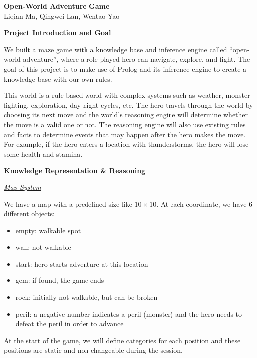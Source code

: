 \documentclass[9pt]{article}
\begin{document}
\begin{center}
\textbf{\Large Open-World Adventure Game}\\[.2cm]
Liqian Ma, Qingwei Lan, Wentao Yao
\end{center}


\begin{multicols*}{2}


\underline{\textbf{\normalsize Project Introduction and Goal}}

We built a maze game with a knowledge base and inference engine called “open-world adventure”, where a role-played hero can navigate, explore, and fight. The goal of this project is to make use of Prolog and its inference engine to create a knowledge base with our own rules.

This world is a rule-based world with complex systems such as weather, monster fighting, exploration, day-night cycles, etc. The hero travels through the world by choosing its next move and the world's reasoning engine will determine whether the move is a valid one or not. The reasoning engine will also use existing rules and facts to determine events that may happen after the hero makes the move. For example, if the hero enters a location with thunderstorms, the hero will lose some health and stamina.



\underline{\textbf{\normalsize Knowledge Representation \& Reasoning}}

\textit{\underline{Map System}}

We have a map with a predefined size like $10 \times 10$. At each coordinate, we have 6 different objects:

\begin{itemize}
\item empty: walkable spot
\item wall:  not walkable
\item start:  hero starts adventure at this location
\item gem: if found, the game ends
\item rock: initially not walkable, but can be broken
\item peril: a negative number indicates a peril (monster) and the hero needs to defeat the peril in order to advance
\end{itemize}

At the start of the game, we will define categories for each position and these positions are static and non-changeable during the session.



\end{multicols*}
\end{document}
